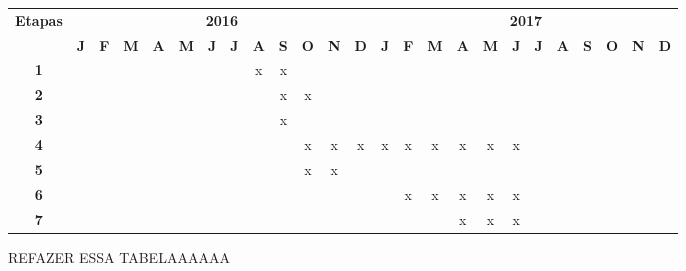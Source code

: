 \vspace{0.5cm}
{\tiny
\noindent \begin{tabular}{|c||c|c|c|c|c|c|c|c|c|c|c|c||c|c|c|c|c|c|c|c|c|c|c|c|}
  \hline
  \multirow{2}{*}{\textbf{\small{Etapas}}} & \multicolumn{12}{|c||}{\textbf{\small{2016}}} & \multicolumn{12}{|c|}{\textbf{\small{2017}}} \\
  \cline{2-25}
   & \textbf{J} & \textbf{F} & \textbf{M} & \textbf{A} & \textbf{M} & \textbf{J} & \textbf{J} & \textbf{A} & \textbf{S} & \textbf{O} & \textbf{N} & \textbf{D} & \textbf{J} & \textbf{F} & \textbf{M} & \textbf{A} & \textbf{M} & \textbf{J} & \textbf{J} & \textbf{A} & \textbf{S} & \textbf{O} & \textbf{N} & \textbf{D} \\
  \hline %
  \hline
  \textbf{\small{1}} & & & & & & & & x & x & & & & & & &  & & & & & & & & \\
  \hline
  \textbf{\small{2}} & & & & & & & &  & x & x & & & & & & & & & & & & & & \\
  \hline
  \textbf{\small{3}} & & & & & & & & & x & & & & & & & & & & & & & & & \\
  \hline
  \textbf{\small{4}} & & & & & & & & & & x & x & x & x & x & x & x & x
  & x & & & & & & \\
  \hline
  \textbf{\small{5}} & & & & & & & & & & x & x & & & & & & & & & & & & & \\
  \hline
  \textbf{\small{6}}  &  & & & & & & & & & & & & & x & x & x & x & x & & & & & & \\
  \hline
  \textbf{\small{7}} & & & & & & & & & & & & & & & & x & x & x & & & & & & \\
  \hline
\end{tabular}
}

REFAZER ESSA TABELAAAAAA
\label{sec:consideracoes_cronograma}
